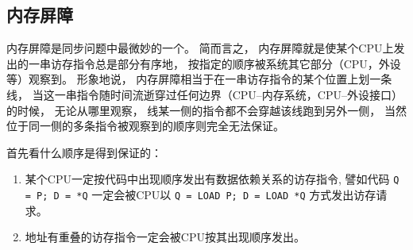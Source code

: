 \subsection{内存屏障}
内存屏障是同步问题中最微妙的一个。
简而言之，
内存屏障就是使某个CPU上发出的一串访存指令总是部分有序地，
按指定的顺序被系统其它部分（CPU，外设等）观察到。
形象地说，
内存屏障相当于在一串访存指令的某个位置上划一条线，
当这一串指令随时间流逝穿过任何边界（CPU--内存系统，CPU--外设接口）的时候，
无论从哪里观察，
线某一侧的指令都不会穿越该线跑到另外一侧，
当然位于同一侧的多条指令被观察到的顺序则完全无法保证。

首先看什么顺序是得到保证的：
\begin{enumerate}
  \item 某个CPU一定按代码中出现顺序发出有数据依赖关系的访存指令,
    譬如代码
    \verb|Q = P; D = *Q|
    一定会被CPU以
    \verb|Q = LOAD P; D = LOAD *Q|
    方式发出访存请求。

  \item 地址有重叠的访存指令一定会被CPU按其出现顺序发出。
\end{enumerate}

